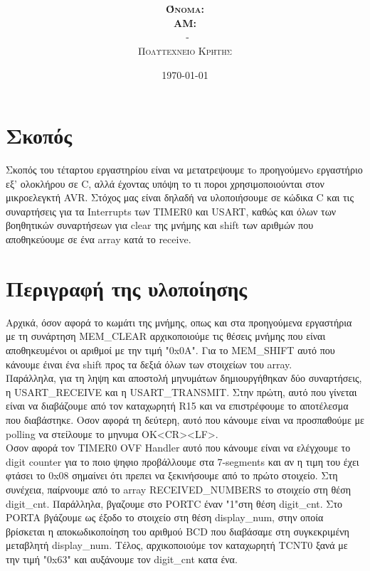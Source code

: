 \documentclass{article}
\title{\underline{\textbf{\assignmentNumber}}}
\author{\textsc{\textbf{Όνομα:}}  \studentName\\
		\textsc{\textbf{ΑΜ:}}  \studentNumber\\
		\course \ - \courseName\\ 
		\textsc{Πολυτεχνείο Κρήτης}
		}
\date{\today}
\begin{document}
	\maketitle

\section*{Σκοπός}
	Σκοπός του τέταρτου εργαστηρίου είναι να μετατρεψουμε τo προηγούμενo εργαστήριο εξ' ολοκλήρου σε C, αλλά έχοντας υπόψη το τι ποροι χρησιμοποιούνται στον μικροελεγκτή AVR. Στόχος μας είναι δηλαδή να υλοποιήσουμε σε κώδικα C και τις συναρτήσεις για τα Interrupts των TIMER0 και USART, καθώς και όλων των βοηθητικών συναρτήσεων για clear της μνήμης και shift των αριθμών που αποθηκεύουμε σε ένα array κατά το receive. \\

\section*{Περιγραφή της υλοποίησης}
	Αρχικά, όσον αφορά το κωμάτι της μνήμης, οπως και στα προηγούμενα εργαστήρια με τη συνάρτηση MEM\_CLEAR αρχικοποιούμε τις θέσεις μνήμης που είναι αποθηκευμένοι οι αριθμοί με την τιμή "0x0A". Για το MEM\_SHIFT αυτό που κάνουμε έιναι ένα shift προς τα δεξιά όλων των στοιχείων του array.\\
	
	\noindent
	Παράλληλα, για τη ληψη και αποστολή μηνυμάτων δημιουργήθηκαν δύο συναρτήσεις, η USART\_RECEIVE και η USART\_TRANSMIT. Στην πρώτη, αυτό που γίνεται είναι να διαβάζουμε από τον καταχωρητή R15 και να επιστρέφουμε το αποτέλεσμα που διαβάστηκε. Οσον αφορά τη δεύτερη, αυτό που κάνουμε είναι να προσπαθούμε με polling να στείλουμε το μηνυμα OK<CR><LF>.\\
	
	\noindent
	Οσον αφορά τον TIMER0 OVF Handler αυτό που κάνουμε είναι να ελέγχουμε το digit counter για το ποιο ψηφιο προβάλλουμε στα 7-segments και αν η τιμη του έχει φτάσει το 0x08 σημαίνει ότι πρεπει να ξεκινήσουμε από το πρώτο στοιχείο. Στη συνέχεια, παίρνουμε από το array RECEIVED\_NUMBERS το στοιχείο στη θέση digit\_cnt. Παράλληλα, βγαζουμε στο PORTC έναν "1"στη θέση digit\_cnt. Στο PORTA βγάζουμε ως έξοδο το στοιχείο στη θέση display\_num, στην οποία βρίσκεται η αποκωδικοποίηση του αριθμού BCD που διαβάσαμε στη συγκεκριμένη μεταβλητή display\_num. Τέλος, αρχικοποιούμε τον καταχωρητή TCNT0 ξανά με την τιμή "0x63" και αυξάνουμε τον digit\_cnt κατα ένα.\\
	
\end{document}
